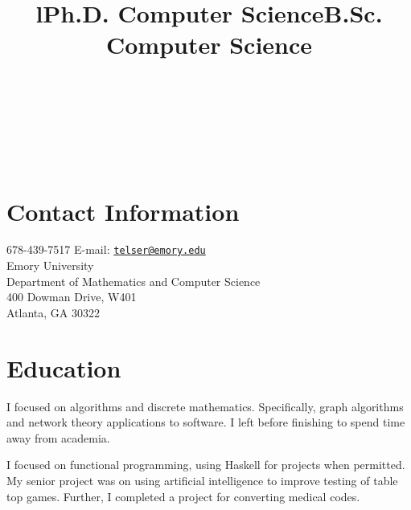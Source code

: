 \documentclass[margintitle,line]{res}
\begin{document}

\begin{resume}

\begin{format}
\\
\title{l}\\
\body\\
\end{format}


\section{Contact Information}

678-439-7517 \hfill {E-mail:} \href{mailto:telser@emory.edu}{\nolinkurl{telser@emory.edu}} \\
Emory University \\
Department of Mathematics and Computer Science \\
400 Dowman Drive, W401 \\
Atlanta, GA 30322


\section{Education}

\title{Ph.D. Computer Science}
\begin{position}
I focused on algorithms and discrete mathematics. Specifically, graph algorithms and network theory applications to software. I left before finishing to spend time away from academia.
\end{position}

\title{B.Sc. Computer Science}
\begin{position}
I focused on functional programming, using Haskell for projects when permitted. My senior project was on using artificial intelligence to improve testing of table top games. Further, I completed a project for converting medical codes.
\end{position}


\end{resume}
\end{document}
